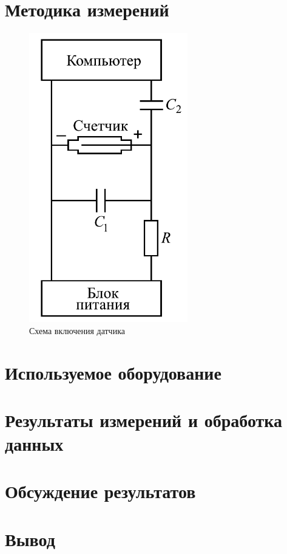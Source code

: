 \documentclass[a4paper, 12pt]{article}
\begin{document}
 	\section{Методика измерений}
	\begin{figure}[H]
		\centering
		\includegraphics[scale = 0.5]{pictures/scheme.png}
		\caption{Схема включения датчика}
	\end{figure}



	\section{Используемое оборудование}

	\section{Результаты измерений и обработка данных}
	\section{Обсуждение результатов}
	\section{Вывод}
\end{document}
